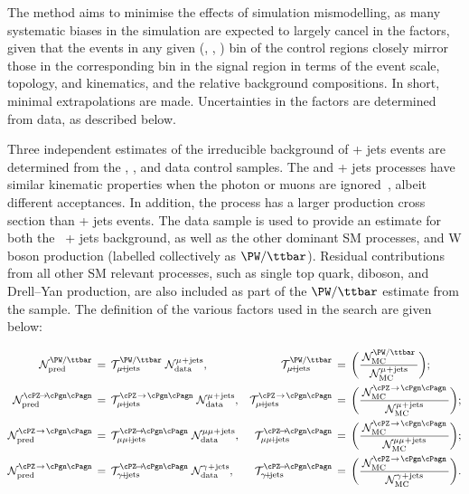 The method aims to minimise the effects of simulation mismodelling, as
many systematic biases in the simulation are expected to largely
cancel in the \tf factors, given that the events in any given (\njet, \nb,
\scalht) bin of the control regions closely mirror those in the
corresponding bin in the signal region in terms of the event scale,
topology, and kinematics, and the relative background compositions. In
short, minimal extrapolations are made. Uncertainties in the \tf factors
are determined from data, as described below.

Three independent estimates of the irreducible background of \znunu +
jets events are determined from the \gj, \mmj, and \mj data control
samples. The \gj and \zmumu + jets processes have similar kinematic
properties when the photon or muons are ignored~\cite{Bern:2011pa},
albeit different acceptances. In addition, the \gj process has a
larger production cross section than \znunu + jets events. The \mj
data sample is used to provide an estimate for both the \znunu\ + jets
background, as well as the other dominant SM processes, \ttbar and W
boson production (labelled collectively as $\PW/\ttbar$). Residual
contributions from all other SM relevant processes, such as single top
quark, diboson, and Drell--Yan production, are also included as part
of the $\PW/\ttbar$ estimate from the \mj sample. The definition of
the various \tf factors used in the search are given below:

\begin{align} 
  \mathcal{N}^\text{\PW/\ttbar}_\text{pred} \, & = \,
  \tf^\text{\PW/\ttbar}_{\mj} \; 
  \mathcal{N}^\text{\mj}_\text{data}, &
  \tf^\text{\PW/\ttbar}_{\mj} \, & = \,
  \bigg( 
  \frac{\,\mathcal{N}^{\PW/\ttbar}_\text{MC}\,}
  {\mathcal{N}^\text{\mj}_\text{MC}}
  \bigg); \\
  \mathcal{N}^{\znunu}_\text{pred} \, & = \,
  \tf^{\text{\znunu}}_{\mj} \; 
  \mathcal{N}^\text{\mj}_\text{data}, &
  \tf^{\text{\znunu}}_{\mj} \, & = \,
  \bigg( 
  \frac{\,\mathcal{N}^\text{\znunu}_\text{MC}\,}
  {\mathcal{N}^\text{\mj}_\text{MC}}
  \bigg); \\
  \mathcal{N}^\text{\znunu}_\text{pred} \, & = \,
  \tf^{\znunu}_{\mmj}  \;
  \mathcal{N}^\text{\mmj}_\text{data}, &
  \tf^{\znunu}_{\mmj}  \, & = \,
  \bigg( 
  \frac{\,\mathcal{N}^\text{\znunu}_\text{MC}\,}
  {\mathcal{N}^\text{\mmj}_\text{MC}}
  \bigg); \\
  \mathcal{N}^\text{\znunu}_\text{pred} \, & = \,
  \tf^{\znunu}_{\gj}  \;
  \mathcal{N}^\text{\gj}_\text{data}, &
  \tf^{\znunu}_{\gj}  \, & = \,
  \bigg( 
  \frac{\,\mathcal{N}^\text{\znunu}_\text{MC}\,}
  {\mathcal{N}^\text{\gj}_\text{MC}}
  \bigg).
\end{align} 

